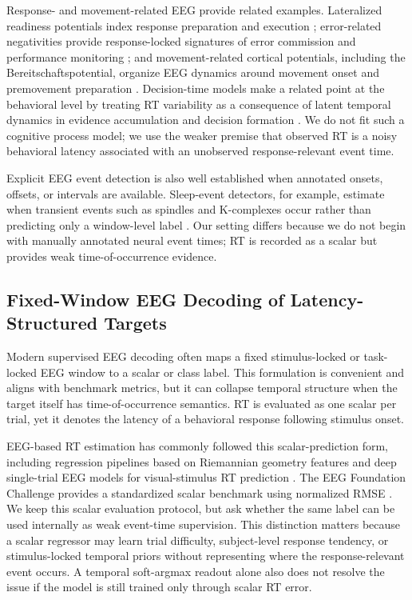\documentclass[12pt]{article}
\begin{document}
Response- and movement-related EEG provide related examples. Lateralized readiness potentials index response preparation and execution \citep{Coles1989LRP}; error-related negativities provide response-locked signatures of error commission and performance monitoring \citep{Gehring1993ErrorDetection,HolroydColes2002ERN}; and movement-related cortical potentials, including the Bereitschaftspotential, organize EEG dynamics around movement onset and premovement preparation \citep{KornhuberDeecke1965BP,ShibasakiHallett2006BP}. Decision-time models make a related point at the behavioral level by treating RT variability as a consequence of latent temporal dynamics in evidence accumulation and decision formation \citep{Ratcliff2008Diffusion,OConnell2012Supramodal,Kelly2013Internal}. We do not fit such a cognitive process model; we use the weaker premise that observed RT is a noisy behavioral latency associated with an unobserved response-relevant event time.

Explicit EEG event detection is also well established when annotated onsets, offsets, or intervals are available. Sleep-event detectors, for example, estimate when transient events such as spindles and K-complexes occur rather than predicting only a window-level label \citep{Chambon2019DOSED,TapiaRivas2024SEED}. Our setting differs because we do not begin with manually annotated neural event times; RT is recorded as a scalar but provides weak time-of-occurrence evidence.

\subsection{Fixed-Window EEG Decoding of Latency-Structured Targets}
Modern supervised EEG decoding often maps a fixed stimulus-locked or task-locked EEG window to a scalar or class label. This formulation is convenient and aligns with benchmark metrics, but it can collapse temporal structure when the target itself has time-of-occurrence semantics. RT is evaluated as one scalar per trial, yet it denotes the latency of a behavioral response following stimulus onset.

EEG-based RT estimation has commonly followed this scalar-prediction form, including regression pipelines based on Riemannian geometry features \citep{Wu2017RiemannianRT} and deep single-trial EEG models for visual-stimulus RT prediction \citep{Chowdhury2020RTSensors}. The EEG Foundation Challenge provides a standardized scalar benchmark using normalized RMSE \citep{EEGFoundationChallengeArxiv2025,EEGChallengeWebsite2025}. We keep this scalar evaluation protocol, but ask whether the same label can be used internally as weak event-time supervision. This distinction matters because a scalar regressor may learn trial difficulty, subject-level response tendency, or stimulus-locked temporal priors without representing where the response-relevant event occurs. A temporal soft-argmax readout alone also does not resolve the issue if the model is still trained only through scalar RT error.
\end{document}
